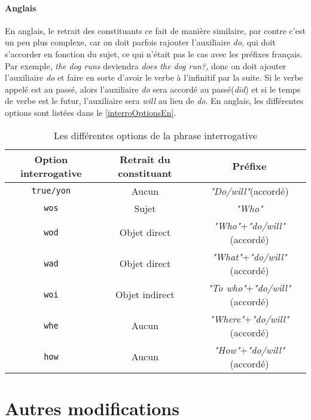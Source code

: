 \documentclass[11pt]{article} %
\newcommand{\real}[1]{\emph{#1}}
\begin{document}
\paragraph{Anglais}

En anglais, le retrait des constituants ce fait de manière similaire,
par contre c'est un peu plus complexe, car on doit parfois rajouter
l'auxiliaire \emph{do, }qui doit s'accorder en fonction du sujet,
ce qui n'était pas le cas avec les préfixes français.\emph{ }Par exemple,
\emph{the dog runs} deviendra \emph{does the dog run?, }donc on doit
ajouter l'auxiliaire \emph{do }et faire en sorte d'avoir le verbe
à l'infinitif par la suite. Si le verbe appelé est au passé, alors
l'auxiliaire \emph{do }sera accordé au passé(\emph{did}) et si le
temps de verbe est le futur, l'auxiliaire sera \emph{will }au lieu
de \emph{do}. En anglais, les différentes options sont listées dans 
le \autoref{interroOptionsEn}.

\begin{table}[h]
\centering
\caption{Les différentes options de la phrase interrogative}
\begin{tabular}{|c|c|c|}
\hline 
Option interrogative & Retrait du constituant & Préfixe\tabularnewline
\hline 
\hline 
\texttt{true/yon} & Aucun & \real{"Do/will"}(accordé)\\
\hline 
\texttt{wos} & Sujet & \real{"Who"}\\
\hline 
\texttt{wod} & Objet direct & \real{"Who"}+\real{"do/will"}(accordé)\\
\hline 
\texttt{wad} & Objet direct & \real{"What"}+\real{"do/will"}(accordé)\\
\hline 
\texttt{woi} & Objet indirect & \real{"To who"}+\real{"do/will"}(accordé)\\
\hline 
\texttt{whe} & Aucun & \real{"Where"}+\real{"do/will"}(accordé)\\
\hline 
\texttt{how} & Aucun & \real{"How"}+\real{"do/will"}(accordé)\\
\hline 
\end{tabular}
\label{interroOptionsEn}
\end{table}

\section{Autres modifications}
\end{document}
